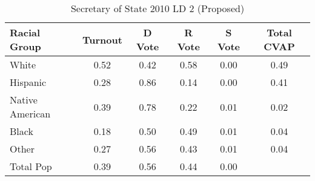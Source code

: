 \begin{table}[htb]
\begin{center}
\caption{Secretary of State 2010 LD 2 (Proposed)}
\label{sos10_cvap_ld_2}
\begin{tabular}{lccccc}
  \hline
Racial Group & Turnout & D Vote & R Vote & S Vote & Total CVAP \\ 
  \hline
White & 0.52 & 0.42 & 0.58 & 0.00 & 0.49 \\ 
  Hispanic & 0.28 & 0.86 & 0.14 & 0.00 & 0.41 \\ 
  Native American & 0.39 & 0.78 & 0.22 & 0.01 & 0.02 \\ 
  Black & 0.18 & 0.50 & 0.49 & 0.01 & 0.04 \\ 
  Other & 0.27 & 0.56 & 0.43 & 0.01 & 0.04 \\ 
  Total Pop & 0.39 & 0.56 & 0.44 & 0.00 &  \\ 
   \hline
\end{tabular}
\end{center}
\end{table}
